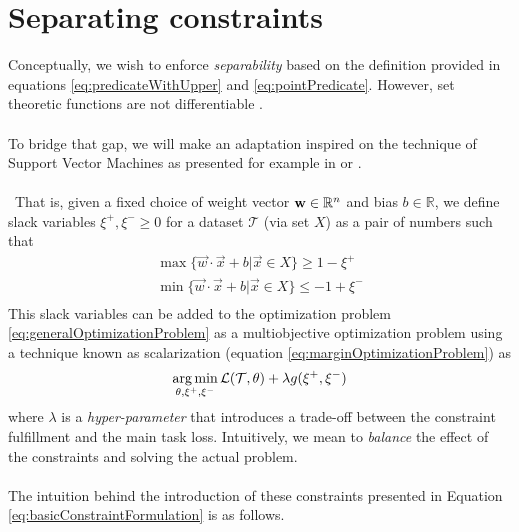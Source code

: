 \section{Separating constraints}\label{sec:constraint}
Conceptually, we wish to enforce \emph{separability} based on the definition provided in equations \ref{eq:predicateWithUpper} and \ref{eq:pointPredicate}. However, set theoretic functions are not differentiable \cite{Glorot10Initialization,lecun2015DeepLearningBig,munkres2000Topology}. 
\\\\
To bridge that gap, we will make an adaptation inspired on the technique of Support Vector Machines as presented for example in  \cite{Burges1998TutorialOnSVMForPatternRecognition} or \cite{Hearst1998SupportVectorMachines}. 
\\\\\
That is, given a fixed choice of weight vector  $\mathbf{w}\in\mathbb{R}^{n}$ and bias $b\in\mathbb{R}$, we define slack variables $\xi^{+},\xi^{-}\geq 0$ for a dataset $\mathcal{T}$ (via set $X$) as a pair of numbers such that
\begin{equation}\label{eq:basicConstraintFormulation}
\begin{array}{lcl}
    \max\{\vec{w}\cdot\vec{x}+b|\vec{x}\in X\}\geq 1-\xi^{+}\\
    \min\{\vec{w}\cdot\vec{x}+b|\vec{x}\in X\}\leq -1+\xi^{-}\\
\end{array}
\end{equation}
This slack variables can be added to the optimization problem \ref{eq:generalOptimizationProblem} as a multiobjective optimization problem using a technique known as scalarization \cite{boyd} (equation \ref{eq:marginOptimizationProblem}) as
\begin{equation}\label{eq:marginOptimizationProblem}
\operatorname*{arg\,min}_{\theta,\xi^{+},\xi^{-}} \mathcal{L}(\mathcal{T},\theta) + \lambda g(\xi^{+},\xi^{-})
\end{equation}
where $\lambda$ is a \emph{hyper-parameter} that introduces a trade-off between the constraint fulfillment and the main task loss. Intuitively, we mean to \emph{balance} the effect of the constraints and solving the actual problem.
\\\\
The intuition behind the introduction of these constraints presented in Equation \ref{eq:basicConstraintFormulation} is as follows. 
\\\\
